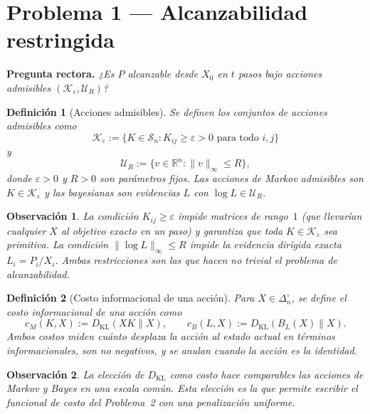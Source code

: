 \documentclass[12pt]{article}
\newtheorem{definicion}{Definición}[section]
\newtheorem{observacion}{Observación}[section]
\begin{document}
\section{Problema 1 --- Alcanzabilidad restringida}

\noindent\textbf{Pregunta rectora.} \textit{¿Es $P$ alcanzable desde $X_0$ en
$t$ pasos bajo acciones admisibles $({\mathcal K}_\varepsilon, {\mathcal U}_R)$?}

\bigskip

\begin{definicion}[Acciones admisibles]
\label{def:acciones}
Se definen los conjuntos de acciones admisibles como
\[
\mathcal{K}_\varepsilon
:=
\bigl\{K\in\mathcal{S}_n : K_{ij}\geq\varepsilon>0\text{ para todo }i,j\bigr\}
\]
y
\[
\mathcal{U}_R
:=
\bigl\{v\in\mathbb{R}^n : \|v\|_\infty\leq R\bigr\},
\]
donde $\varepsilon>0$ y $R>0$ son parámetros fijos. Las acciones de Markov
admisibles son $K\in\mathcal{K}_\varepsilon$ y las bayesianas son evidencias $L$
con $\log L\in\mathcal{U}_R$.
\end{definicion}

\begin{observacion}
La condición $K_{ij}\geq\varepsilon$ impide matrices de rango~$1$ (que llevarían
cualquier $X$ al objetivo exacto en un paso) y garantiza que toda
$K\in\mathcal{K}_\varepsilon$ sea primitiva. La condición $\|\log L\|_\infty\leq R$
impide la evidencia dirigida exacta $L_i=P_i/X_i$. Ambas restricciones son las
que hacen no trivial el problema de alcanzabilidad.
\end{observacion}

\begin{definicion}[Costo informacional de una acción]
\label{def:costo}
Para $X\in\Delta_n^\circ$, se define el costo informacional de una acción como
\[
c_M(K,X):=D_{\mathrm{KL}}(XK\|X),
\qquad
c_B(L,X):=D_{\mathrm{KL}}(B_L(X)\|X).
\]
Ambos costos miden cuánto desplaza la acción al estado actual en términos
informacionales, son no negativos, y se anulan cuando la acción es la identidad.
\end{definicion}

\begin{observacion}
La elección de $D_{\mathrm{KL}}$ como costo hace comparables las acciones de
Markov y Bayes en una escala común. Esta elección es la que permite escribir
el funcional de costo del Problema~2 con una penalización uniforme.
\end{observacion}
\end{document}
